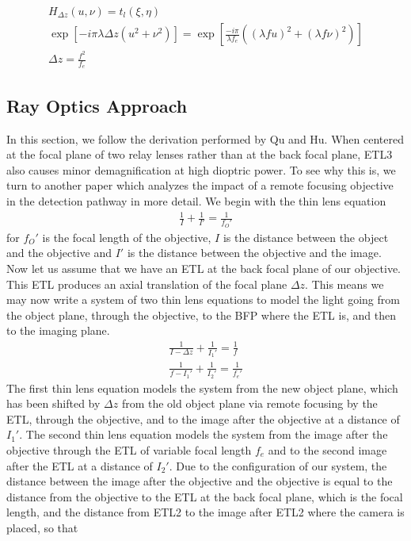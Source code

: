 \begin{gather} 
		H_{\Delta z}(u,\nu)=t_l(\xi, \eta) \\
		\exp\left[-i \pi \lambda \Delta z (u^2 + \nu^2)\right]= \exp\left[ \frac{-i \pi}{\lambda f_e}\left((\lambda f u)^2 + (\lambda f \nu)^2\right)\right]\\
		\Delta z = \frac{f^2}{f_e}
\end{gather}

\subsection{Ray Optics Approach}
In this section, we follow the derivation performed by Qu and Hu. \cite{Qu} When centered at the focal plane of two relay lenses rather than at the back focal plane, ETL3 also causes minor demagnification at high dioptric power. To see why this is, we turn to another paper which analyzes the impact of a remote focusing objective in the detection pathway in more detail. We begin with the thin lens equation
\begin{gather}
	\frac{1}{I} + \frac{1}{I'} = \frac 1 {f_O'}
\end{gather}
for $f_O'$ is the focal length of the objective, $I$ is the distance between the object and the objective and $I'$ is the distance between the objective and the image. Now let us assume that we have an ETL at the back focal plane of our objective. This ETL produces an axial translation of the focal plane $\Delta z$. This means we may now write a system of two thin lens equations to model the light going from the object plane, through the objective, to the BFP where the ETL is, and then to the imaging plane.
\begin{gather}
	\frac{1}{I-\Delta z} + \frac{1}{I_1'}  = \frac 1{f}\\
	\frac{1}{f -I_1'}+\frac{1}{I_2'} = \frac{1}{f_e'}
\end{gather}
The first thin lens equation models the system from the new object plane, which has been shifted by $\Delta z$ from the old object plane via remote focusing by the ETL, through the objective, and to the image after the objective at a distance of $I_1'$. The second thin lens equation models the system from the image after the objective through the ETL of variable focal length $f_e$ and to the second image after the ETL at a distance of $I_2'$. Due to the configuration of our system, the distance between the image after the objective and the objective is equal to the distance from the objective to the ETL at the back focal plane, which is the focal length, and the distance from ETL2 to the image after ETL2 where the camera is placed, so that
